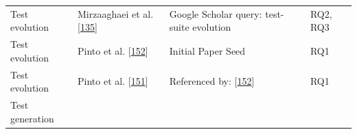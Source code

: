\documentclass[]{book}
\begin{document}
\begin{longtable}[]{@{}llll@{}}
\begin{minipage}[t]{0.18\columnwidth}\raggedright\strut
Test evolution\strut
\end{minipage} & \begin{minipage}[t]{0.16\columnwidth}\raggedright\strut
Mirzaaghaei et al.
{[}\protect\hyperlink{ref-supportingtestsuite}{135}{]}\strut
\end{minipage} & \begin{minipage}[t]{0.50\columnwidth}\raggedright\strut
Google Scholar query: test-suite evolution\strut
\end{minipage} & \begin{minipage}[t]{0.04\columnwidth}\raggedright\strut
RQ2, RQ3\strut
\end{minipage}\tabularnewline
\begin{minipage}[t]{0.18\columnwidth}\raggedright\strut
Test evolution\strut
\end{minipage} & \begin{minipage}[t]{0.16\columnwidth}\raggedright\strut
Pinto et al.
{[}\protect\hyperlink{ref-pinto2012understanding}{152}{]}\strut
\end{minipage} & \begin{minipage}[t]{0.50\columnwidth}\raggedright\strut
Initial Paper Seed\strut
\end{minipage} & \begin{minipage}[t]{0.04\columnwidth}\raggedright\strut
RQ1\strut
\end{minipage}\tabularnewline
\begin{minipage}[t]{0.18\columnwidth}\raggedright\strut
Test evolution\strut
\end{minipage} & \begin{minipage}[t]{0.16\columnwidth}\raggedright\strut
Pinto et al. {[}\protect\hyperlink{ref-pinto2013}{151}{]}\strut
\end{minipage} & \begin{minipage}[t]{0.50\columnwidth}\raggedright\strut
Referenced by:
{[}\protect\hyperlink{ref-pinto2012understanding}{152}{]}\strut
\end{minipage} & \begin{minipage}[t]{0.04\columnwidth}\raggedright\strut
RQ1\strut
\end{minipage}\tabularnewline
\begin{minipage}[t]{0.18\columnwidth}\raggedright\strut
Test generation\strut
\end{minipage} & \begin{minipage}[t]{0.16\columnwidth}\raggedright\strut

\end{minipage}
\end{longtable}
\end{document}
